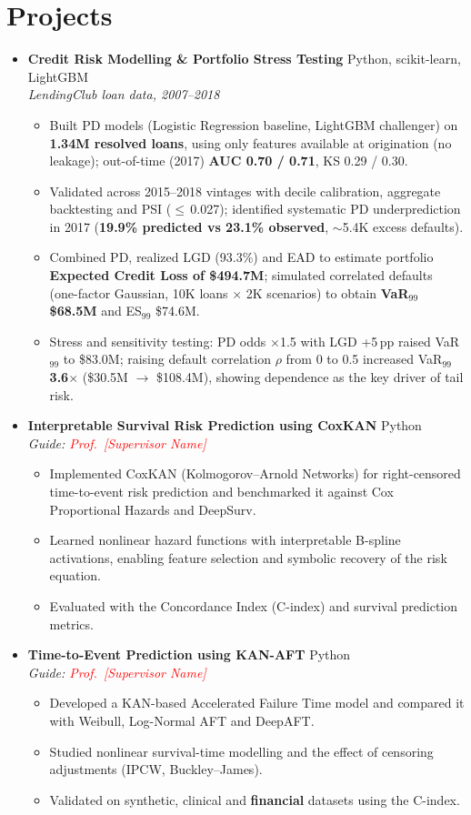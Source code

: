 \documentclass[10pt,a4paper]{article}
\newcommand{\proj}[3]{\item \textbf{#1} \hfill {\small #2}\\[-0.1em]
  {\small\textit{#3}}}
\newcommand{\PROF}{\textcolor{red}{Prof.\ [Supervisor Name]}}
\begin{document}
\section{Projects}
\begin{itemize}
\proj{Credit Risk Modelling \& Portfolio Stress Testing}{Python, scikit-learn, LightGBM}{LendingClub loan data, 2007--2018}
  \begin{itemize}
  \item Built PD models (Logistic Regression baseline, LightGBM challenger) on \textbf{1.34M resolved loans}, using only features available at origination (no leakage); out-of-time (2017) \textbf{AUC 0.70 / 0.71}, KS 0.29 / 0.30.
  \item Validated across 2015--2018 vintages with decile calibration, aggregate backtesting and PSI ($\leq$\,0.027); identified systematic PD underprediction in 2017 (\textbf{19.9\% predicted vs 23.1\% observed}, $\sim$5.4K excess defaults).
  \item Combined PD, realized LGD (93.3\%) and EAD to estimate portfolio \textbf{Expected Credit Loss of \$494.7M}; simulated correlated defaults (one-factor Gaussian, 10K loans $\times$ 2K scenarios) to obtain \textbf{VaR$_{99}$ \$68.5M} and ES$_{99}$ \$74.6M.
  \item Stress and sensitivity testing: PD odds $\times$1.5 with LGD +5\,pp raised VaR$_{99}$ to \$83.0M; raising default correlation $\rho$ from 0 to 0.5 increased VaR$_{99}$ \textbf{3.6$\times$} (\$30.5M $\to$ \$108.4M), showing dependence as the key driver of tail risk.
  \end{itemize}
\proj{Interpretable Survival Risk Prediction using CoxKAN}{Python}{Guide: \PROF}
  \begin{itemize}
  \item Implemented CoxKAN (Kolmogorov--Arnold Networks) for right-censored time-to-event risk prediction and benchmarked it against Cox Proportional Hazards and DeepSurv.
  \item Learned nonlinear hazard functions with interpretable B-spline activations, enabling feature selection and symbolic recovery of the risk equation.
  \item Evaluated with the Concordance Index (C-index) and survival prediction metrics.
  \end{itemize}
\proj{Time-to-Event Prediction using KAN-AFT}{Python}{Guide: \PROF}
  \begin{itemize}
  \item Developed a KAN-based Accelerated Failure Time model and compared it with Weibull, Log-Normal AFT and DeepAFT.
  \item Studied nonlinear survival-time modelling and the effect of censoring adjustments (IPCW, Buckley--James).
  \item Validated on synthetic, clinical and \textbf{financial} datasets using the C-index.
  \end{itemize}
\end{itemize}
\end{document}
